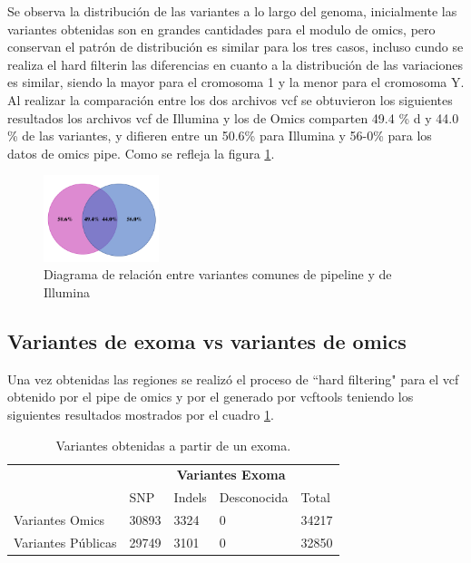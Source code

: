 Se observa la distribución de las variantes a lo largo del genoma, inicialmente las variantes obtenidas son en grandes cantidades para el modulo de omics, pero conservan el patrón de distribución es similar para los tres casos, incluso cundo se realiza el hard filterin las diferencias en cuanto a la distribución de las variaciones es similar, siendo la mayor para el cromosoma 1 y la menor para el cromosoma Y. \\

Al realizar la comparación entre los dos archivos vcf se obtuvieron los siguientes resultados los archivos vcf de Illumina y los de Omics comparten 49.4 \% d y 44.0 \% de las variantes, y difieren entre un 50.6\% para Illumina y 56-0\% para los datos de omics pipe. Como se refleja la figura \ref{fig:diagrama}. \\

\begin{figure}[]
	\centering
	\includegraphics[width=0.3\textwidth]{Kap2/validacion2}
	\caption{Diagrama de relación entre variantes comunes de pipeline y de Illumina} \label{fig:diagrama}
\end{figure}

\subsection*{Variantes de exoma vs variantes de omics}

Una vez obtenidas las regiones se realizó el proceso de ``hard filtering" para el vcf obtenido por el pipe de omics y por el generado por vcftools teniendo los siguientes resultados mostrados por el cuadro \ref{tabla:tabla2}. \\

\begin{table}[H]
	\centering  
	\begin{tabular}{|l|l|l|l|l|}
		\hline
		& \multicolumn{4}{c|}{\textbf{Variantes Exoma}} \\
		\cline{2-5} 
		& SNP  & Indels & Desconocida & Total \\ \cline{2-5}
		\hline 
		\multirow{1}{4cm}{Variantes Omics} & 30893 & 3324 & 0 & 34217 \\ \cline{2-5}
		\hline 
		\multirow{1}{4cm}{Variantes Públicas} & 29749 & 3101 & 0 & 32850 \\ \cline{2-5}
		\hline
	\end{tabular}
	\caption{Variantes obtenidas a partir de un exoma.}
	\label{tabla:tabla2}
\end{table} 

